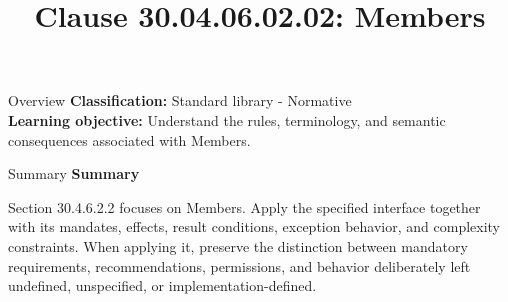 \documentclass[10pt,letterpaper]{article}
\title{Clause 30.04.06.02.02: Members}
\author{}
\date{}
\begin{document}
\maketitle
\begin{CornellOverviewBox}{Overview}
\textbf{Classification:} Standard library - Normative\\[2pt]
\textbf{Learning objective:} Understand the rules, terminology, and semantic consequences associated with Members.
\end{CornellOverviewBox}\begin{CornellSummaryBox}{Summary}
{\sffamily\bfseries\color{Accent} Summary}\par\vspace{3pt}Section 30.4.6.2.2 focuses on Members. Apply the specified interface together with its mandates, effects, result conditions, exception behavior, and complexity constraints. When applying it, preserve the distinction between mandatory requirements, recommendations, permissions, and behavior deliberately left undefined, unspecified, or implementation-defined.
\end{CornellSummaryBox}
\end{document}
